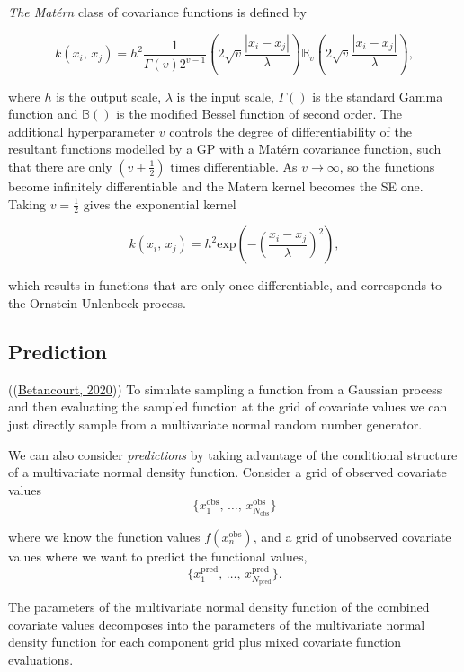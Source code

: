 \documentclass[a4paper, 10pt]{article}
\begin{document}
\begin{flushleft}
   \vspace{1em}

   \textit{The Mat\'ern} class of covariance functions is defined by

   $$k(x_{i}, \, x_{j}) = h^{2} \frac{1}{\Gamma(v)2^{v-1}} (2\sqrt{v}\frac{|x_{i} - x_{j}|}{\lambda}) \mathbb{B}_{v} (2\sqrt{v}\frac{|x_{i} - x_{j}|}{\lambda}),$$

   where $h$ is the output scale, $\lambda$ is the input scale, $\Gamma()$ is the standard Gamma function and $\mathbb{B}()$ is the modified Bessel function of second order. The additional hyperparameter $v$ controls the degree of differentiability of the resultant functions modelled by a GP with a Mat\'ern covariance function, such that there are only $(v + \frac{1}{2})$ times differentiable. As $v \to \infty$, so the functions become infinitely differentiable and the Matern kernel becomes the SE one. Taking $v = \frac{1}{2}$ gives the exponential kernel

   $$k(x_{i}, \, x_{j}) = h^{2} \text{exp}(-(\frac{x_i - x_j}{\lambda})^2),$$

   which results in functions that are only once differentiable, and corresponds to the Ornstein-Unlenbeck process.

   \subsection*{Prediction}

   ((\hyperref[Betancourt2020]{Betancourt, 2020})) To simulate sampling a function from a Gaussian process and then evaluating the sampled function at the grid of covariate values we can just directly sample from a multivariate normal random number generator.

   \vspace{1em}

   We can also consider \textit{predictions} by taking advantage of the conditional structure of a multivariate normal density function. Consider a grid of observed covariate values $$\{x_{1}^{\text{obs}}, \, \ldots, \, x_{N_{\text{obs}}}^{\text{obs}}\}$$

   where we know the function values $f(x_{n}^{\text{obs}})$, and a grid of unobserved covariate values where we want to predict the functional values, $$\{x_{1}^{\text{pred}}, \, \ldots, \, x_{N_{\text{pred}}}^{\text{pred}}\}.$$

   The parameters of the multivariate normal density function of the combined covariate values decomposes into the parameters of the multivariate normal density function for each component grid plus mixed covariate function evaluations.


\end{flushleft}
\end{document}
